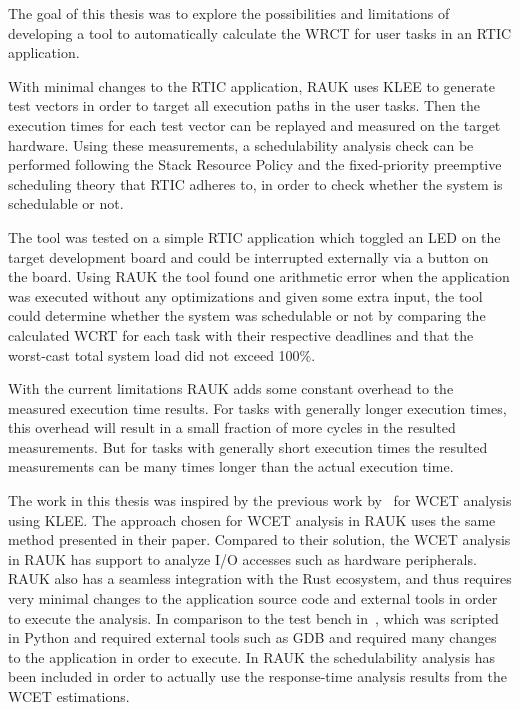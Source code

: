 The goal of this thesis was to explore the possibilities and limitations of
developing a tool to automatically calculate the WRCT for user tasks in an
RTIC application.

With minimal changes to the RTIC application, RAUK uses KLEE to generate test
vectors in order to target all execution paths in the user tasks. Then the
execution times for each test vector can be replayed and measured on the target
hardware. Using these measurements, a schedulability analysis check can be
performed following the Stack Resource Policy and the fixed-priority preemptive
scheduling theory that RTIC adheres to, in order to check whether the system is
schedulable or not.


The tool was tested on a simple RTIC application which toggled an LED on the
target development board and could be interrupted externally via a button
on the board. Using RAUK the tool found one arithmetic error when the
application was executed without any optimizations and given some extra input,
the tool could determine whether the system was schedulable or not by comparing
the calculated WCRT for each task with their respective deadlines and that the
worst-cast total system load did not exceed 100\%.

With the current limitations RAUK adds some constant overhead to the measured
execution time results. For tasks with generally longer execution times, this
overhead will result in a small fraction of more cycles in the resulted
measurements. But for tasks with generally short execution times the resulted
measurements can be many times longer than the actual execution time.

The work in this thesis was inspired by the previous work by~\cite{lindner} for
WCET analysis using KLEE. The approach chosen for WCET analysis in RAUK uses
the same method presented in their paper. Compared to their solution, the WCET
analysis in RAUK has support to analyze I/O accesses such as hardware
peripherals. RAUK also has a seamless integration with the Rust ecosystem, and
thus requires very minimal changes to the application source code and external
tools in order to execute the analysis. In comparison to the test bench
in~\cite{lindner}, which was scripted in Python and required external tools
such as GDB and required many changes to the application in order to execute.
In RAUK the schedulability analysis has been included in order to actually use
the response-time analysis results from the WCET estimations.

